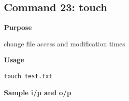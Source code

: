 \subsection{Command 23: touch} 
\textbf{Purpose}
\begin{flushleft}
 change file access and modification times
\end{flushleft}
\textbf{Usage}
\begin{verbatim}
touch test.txt
\end{verbatim}
\textbf{Sample i/p and o/p}
\begin{figure}[H] 
\end{figure}
